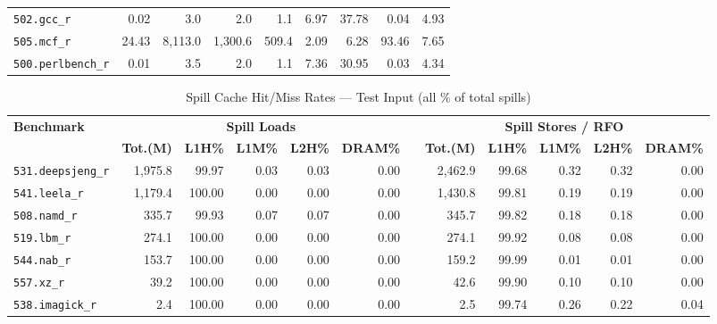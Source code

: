 \documentclass[conference]{IEEEtran}
\begin{document}
\begin{landscape}
\begin{table}[p]
\begin{tabular}{lrrrrrrrr}
\texttt{502.gcc\_r} & 0.02 & 3.0 & 2.0 & 1.1 & 6.97 & 37.78 & 0.04 & 4.93 \\

\texttt{505.mcf\_r} & 24.43 & 8,113.0 & 1,300.6 & 509.4 & 2.09 & 6.28 & 93.46 & 7.65 \\

\texttt{500.perlbench\_r} & 0.01 & 3.5 & 2.0 & 1.1 & 7.36 & 30.95 & 0.03 & 4.34 \\

\bottomrule\end{tabular}\end{table}

\begin{table}[p]
\centering\caption{Spill Cache Hit/Miss Rates --- Test Input (all \% of total spills)}\label{tab:cache}\small
\begin{tabular}{lrrrrrrrrrrr}
\toprule
\multirow{2}{*}{\textbf{Benchmark}}
  & \multicolumn{5}{c}{\textbf{Spill Loads}} & \phantom{a}
  & \multicolumn{5}{c}{\textbf{Spill Stores / RFO}} \\
\cmidrule{2-6}\cmidrule{8-12}
  & \textbf{Tot.(M)} & \textbf{L1H\%} & \textbf{L1M\%} & \textbf{L2H\%} & \textbf{DRAM\%}
  && \textbf{Tot.(M)} & \textbf{L1H\%} & \textbf{L1M\%} & \textbf{L2H\%} & \textbf{DRAM\%} \\
\midrule

\texttt{531.deepsjeng\_r} & 1,975.8 & 99.97 & 0.03 & 0.03 & 0.00 && 2,462.9 & 99.68 & 0.32 & 0.32 & 0.00 \\

\texttt{541.leela\_r} & 1,179.4 & 100.00 & 0.00 & 0.00 & 0.00 && 1,430.8 & 99.81 & 0.19 & 0.19 & 0.00 \\

\texttt{508.namd\_r} & 335.7 & 99.93 & 0.07 & 0.07 & 0.00 && 345.7 & 99.82 & 0.18 & 0.18 & 0.00 \\

\texttt{519.lbm\_r} & 274.1 & 100.00 & 0.00 & 0.00 & 0.00 && 274.1 & 99.92 & 0.08 & 0.08 & 0.00 \\

\texttt{544.nab\_r} & 153.7 & 100.00 & 0.00 & 0.00 & 0.00 && 159.2 & 99.99 & 0.01 & 0.01 & 0.00 \\

\texttt{557.xz\_r} & 39.2 & 100.00 & 0.00 & 0.00 & 0.00 && 42.6 & 99.90 & 0.10 & 0.10 & 0.00 \\

\texttt{538.imagick\_r} & 2.4 & 100.00 & 0.00 & 0.00 & 0.00 && 2.5 & 99.74 & 0.26 & 0.22 & 0.04 \\


\end{tabular}
\end{table}
\end{landscape}
\end{document}
